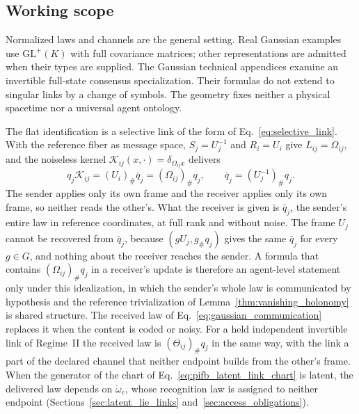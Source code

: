 \subsection{Working scope}\label{sec:working_framework}\label{sec:gauge_group_choice}
Normalized laws and channels are the general setting. Real Gaussian examples use $\mathrm{GL}^+(K)$ with full covariance matrices; other representations are admitted when their types are supplied. The Gaussian technical appendices examine an invertible full-state consensus specialization. Their formulas do not extend to singular links by a change of symbols. The geometry fixes neither a physical spacetime nor a universal agent ontology.

\begin{remark}\label{rem:full_state_idealization}
The flat identification is a selective link of the form of Eq.~\eqref{eq:selective_link}. With the reference fiber as message space, $S_j=U_j^{-1}$ and $R_i=U_i$ give $L_{ij}=\Omega_{ij}$, and the noiseless kernel $\mathcal K_{ij}(x,\cdot)=\delta_{\Omega_{ij}x}$ delivers
\begin{equation}
q_j\mathcal K_{ij}=(U_i)_\#\bar q_j=(\Omega_{ij})_\#q_j,\qquad
\bar q_j=(U_j^{-1})_\#q_j.
\label{eq:full_state_received_law}
\end{equation}
The sender applies only its own frame and the receiver applies only its own frame, so neither reads the other's. What the receiver is given is $\bar q_j$, the sender's entire law in reference coordinates, at full rank and without noise. The frame $U_j$ cannot be recovered from $\bar q_j$, because $(gU_j,g_\#q_j)$ gives the same $\bar q_j$ for every $g\in G$, and nothing about the receiver reaches the sender. A formula that contains $(\Omega_{ij})_\#q_j$ in a receiver's update is therefore an agent-level statement only under this idealization, in which the sender's whole law is communicated by hypothesis and the reference trivialization of Lemma~\ref{thm:vanishing_holonomy} is shared structure. The received law of Eq.~\eqref{eq:gaussian_communication} replaces it when the content is coded or noisy. For a held independent invertible link of Regime~II the received law is $(\Theta_{ij})_\#q_j$ in the same way, with the link a part of the declared channel that neither endpoint builds from the other's frame. When the generator of the chart of Eq.~\eqref{eq:pifb_latent_link_chart} is latent, the delivered law depends on $\mathring\omega_e$, whose recognition law is assigned to neither endpoint (Sections~\ref{sec:latent_lie_links} and~\ref{sec:access_obligations}).
\end{remark}

